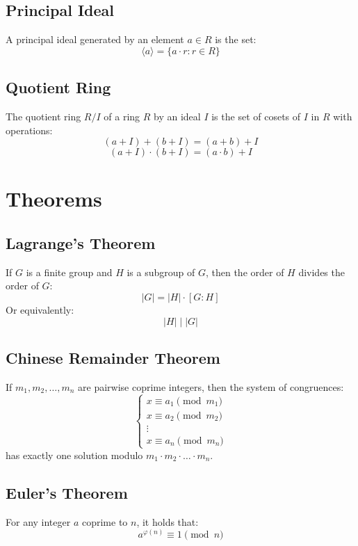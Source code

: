 \documentclass{article}
\begin{document}
\subsection{Principal Ideal}

A principal ideal generated by an element \( a \in R \) is the set:
\[ \langle a \rangle = \{ a \cdot r : r \in R \} \]

\subsection{Quotient Ring}

The quotient ring \( R/I \) of a ring \( R \) by an ideal \( I \) is the set of cosets of \( I \) in \( R \) with operations:
\[ (a + I) + (b + I) = (a + b) + I \]
\[ (a + I) \cdot (b + I) = (a \cdot b) + I \]

\section{Theorems}

\subsection{Lagrange's Theorem}

If \( G \) is a finite group and \( H \) is a subgroup of \( G \), then the order of \( H \) divides the order of \( G \):
\[ |G| = |H| \cdot [G : H] \]
Or equivalently:
\[ |H| \mid |G| \]

\subsection{Chinese Remainder Theorem}

If \( m_1, m_2, \ldots, m_n \) are pairwise coprime integers, then the system of congruences:
\[ \begin{cases} x \equiv a_1 \pmod{m_1} \\ x \equiv a_2 \pmod{m_2} \\ \vdots \\ x \equiv a_n \pmod{m_n} \end{cases} \]
has exactly one solution modulo \( m_1 \cdot m_2 \cdot \ldots \cdot m_n \).

\subsection{Euler's Theorem}

For any integer \( a \) coprime to \( n \), it holds that:
\[ a^{\varphi(n)} \equiv 1 \pmod{n} \]
\end{document}
